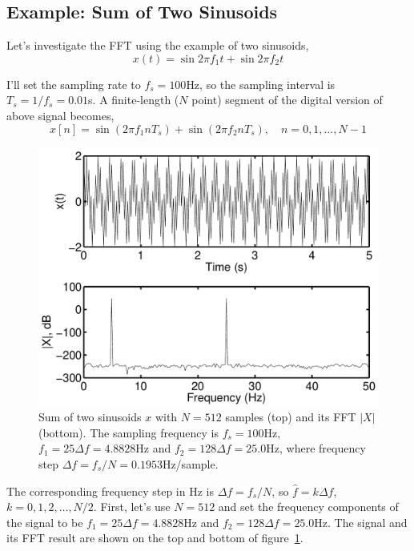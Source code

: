 \subsection{Example: Sum of Two Sinusoids}

Let's investigate the FFT using the example of two sinusoids,
\begin{equation}
x(t) = \sin 2\pi f_1 t + \sin 2\pi f_2 t
\end{equation}

I'll set the sampling rate to $f_s=100$Hz, so the sampling interval is
$T_s=1/f_s=0.01$s. A finite-length ($N$ point) segment of the digital
version of above signal becomes,
\begin{equation}
x[n] = \sin(2\pi f_1 n T_s) + \sin(2\pi f_2 n T_s),
      \quad n=0,1,\ldots, N-1
\end{equation}

\begin{figure}
\centerline{\includegraphics[width=5in]{ch-fft/fft_sin_xX}}
\caption[Sum of two sinusoids with 512 samples and its 
FFT]{Sum of two sinusoids $x$ with $N=512$ samples (top) and its
FFT $|X|$ (bottom). The sampling frequency is $f_s=100$Hz, $f_1=25
\Delta f=4.8828$Hz and $f_2=128 \Delta f=25.0$Hz, where frequency step
$\Delta f=f_s/N=0.1953$Hz/sample.
\label{fig:fft-sin-xX}}
\end{figure}

The corresponding frequency step in Hz is $\Delta f=f_s/N$, so
$\hat{f}=k \Delta f$, $k=0, 1,2,\ldots, N/2$. First, let's use $N=512$
and set the frequency components of the signal to be $f_1=25 \Delta
f=4.8828$Hz and $f_2=128 \Delta f=25.0$Hz. The signal and its FFT
result are shown on the top and bottom of figure~\ref{fig:fft-sin-xX}.

